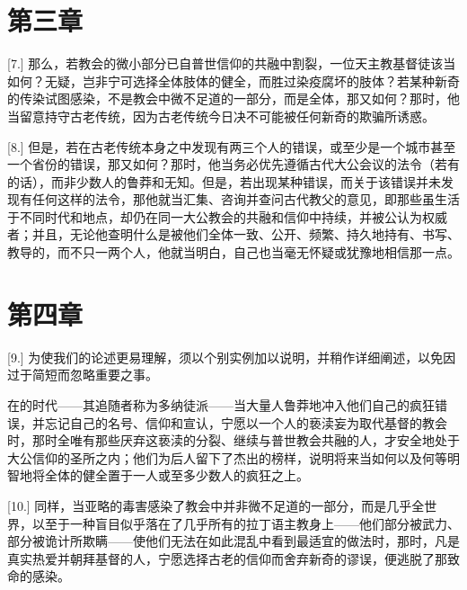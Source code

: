 
\section{第三章}

\par

[7.] 那么，若教会的微小部分已自普世信仰的共融中割裂，一位天主教基督徒该当如何？无疑，岂非宁可选择全体肢体的健全，而胜过染疫腐坏的肢体？若某种新奇的传染试图感染，不是教会中微不足道的一部分，而是全体，那又如何？那时，他当留意持守古老传统，因为古老传统今日决不可能被任何新奇的欺骗所诱惑。\par

[8.] 但是，若在古老传统本身之中发现有两三个人的错误，或至少是一个城市甚至一个省份的错误，那又如何？那时，他当务必优先遵循古代大公会议的法令（若有的话），而非少数人的鲁莽和无知。但是，若出现某种错误，而关于该错误并未发现有任何这样的法令，那他就当汇集、咨询并查问古代教父的意见，即那些虽生活于不同时代和地点，却仍在同一大公教会的共融和信仰中持续，并被公认为权威者；并且，无论他查明什么是被他们全体一致、公开、频繁、持久地持有、书写、教导的，而不只一两个人，他就当明白，自己也当毫无怀疑或犹豫地相信那一点。\par


\section{第四章}

\par

[9.] 为使我们的论述更易理解，须以个别实例加以说明，并稍作详细阐述，以免因过于简短而忽略重要之事。\par

在的时代——其追随者称为多纳徒派——当大量人鲁莽地冲入他们自己的疯狂错误，并忘记自己的名号、信仰和宣认，宁愿以一个人的亵渎妄为取代基督的教会时，那时全唯有那些厌弃这亵渎的分裂、继续与普世教会共融的人，才安全地处于大公信仰的圣所之内；他们为后人留下了杰出的榜样，说明将来当如何以及何等明智地将全体的健全置于一人或至多少数人的疯狂之上。\par

[10.] 同样，当亚略的毒害感染了教会中并非微不足道的一部分，而是几乎全世界，以至于一种盲目似乎落在了几乎所有的拉丁语主教身上——他们部分被武力、部分被诡计所欺瞒——使他们无法在如此混乱中看到最适宜的做法时，那时，凡是真实热爱并朝拜基督的人，宁愿选择古老的信仰而舍弃新奇的谬误，便逃脱了那致命的感染。\par

